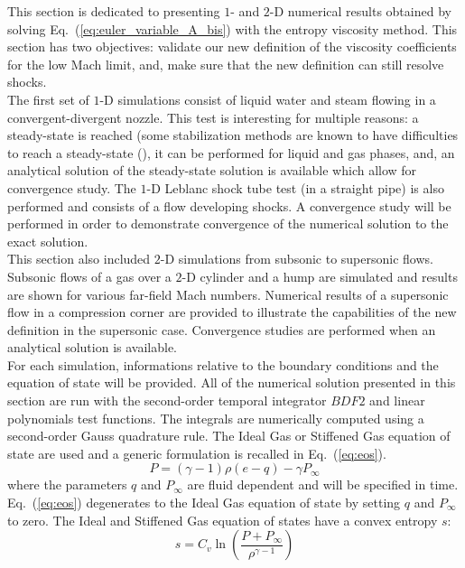 \documentclass[preprint,10pt]{elsarticle}
\newcommand{\eqt}[1]{Eq.~(\ref{#1})}                     %
\begin{document}
This section is dedicated to presenting $1$- and $2$-D numerical results obtained by solving \eqt{eq:euler_variable_A_bis} with the entropy viscosity method. This section has two objectives: validate our new definition of the viscosity coefficients for the low Mach limit, and, make sure that the new definition can still resolve shocks.\\
The first set of $1$-D simulations consist of liquid water and steam flowing in a convergent-divergent nozzle. This test is interesting for multiple reasons: a steady-state is reached (some stabilization methods are known to have difficulties to reach a steady-state (\cite{FluxLimiter, FluxLimiter2}), it can be performed for liquid and gas phases, and, an analytical solution of the steady-state solution is available which allow for convergence study. The $1$-D Leblanc shock tube test \cite{Leblanc} (in a straight pipe) is also performed and consists of a flow developing shocks. A convergence study will be performed in order to demonstrate convergence of the numerical solution to the exact solution.\\ 
This section also included $2$-D simulations from subsonic to supersonic flows. Subsonic flows of a gas over a $2$-D cylinder and a hump \cite{Hump} are simulated and results are shown for various far-field Mach numbers. Numerical results of a supersonic flow in a compression corner are provided to illustrate the capabilities of the new definition in the supersonic case. Convergence studies are performed when an analytical solution is available. \\
For each simulation, informations relative to the boundary conditions and the equation of state will be provided. All of the numerical solution presented in this section are run with the second-order temporal integrator $BDF2$ and linear polynomials test functions. The integrals are numerically computed using a second-order Gauss quadrature rule. The Ideal Gas \cite{IGEOS} or Stiffened Gas equation of state \cite{SGEOS} are used and a generic formulation is recalled in \eqt{eq:eos}.
\begin{equation}
\label{eq:eos}
P = (\gamma-1) \rho (e-q) - \gamma P_{\infty}
\end{equation}
where the parameters $q$ and $P_{\infty}$ are fluid dependent and will be specified in time. \eqt{eq:eos} degenerates to the Ideal Gas equation of state by setting $q$ and $P_{\infty}$ to zero. The Ideal and Stiffened Gas equation of states have a convex entropy $s$:
\begin{equation}
s = C_v \ln \left( \frac{P+P_{\infty}}{\rho^{\gamma-1}} \right) \nonumber
\end{equation}
\end{document}
